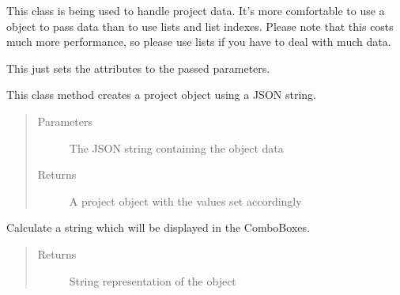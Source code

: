 \documentclass[letterpaper,10pt,english]{sphinxmanual}
\begin{document}
\begin{fulllineitems}
\label{\detokenize{src:src.Project.Project}}
This class is being used to handle project data.
It’s more comfortable to use a object to pass data
than to use lists and list indexes. Please note that
this costs much more performance, so please use lists
if you have to deal with much data.

\begin{fulllineitems}
\label{\detokenize{src:src.Project.Project.__init__}}
This just sets the attributes to the passed parameters.

\end{fulllineitems}


\begin{fulllineitems}
\label{\detokenize{src:src.Project.Project.fromJSON}}
This class method creates a project object using a JSON string.
\begin{quote}\begin{description}
\item[{Parameters}] \leavevmode
{} \textendash{} The JSON string containing the object data

\item[{Returns}] \leavevmode
A project object with the values set accordingly

\end{description}\end{quote}

\end{fulllineitems}


\begin{fulllineitems}
\label{\detokenize{src:src.Project.Project.toComboBoxString}}
Calculate a string which will be displayed in the ComboBoxes.
\begin{quote}\begin{description}
\item[{Returns}] \leavevmode
String representation of the object


\end{description}
\end{quote}
\end{fulllineitems}
\end{fulllineitems}
\end{document}
